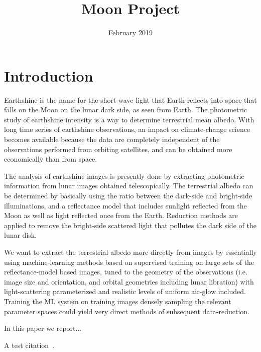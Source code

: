\documentclass[12pt,a4paper]{article}
\title{Moon Project}
\author{}
\date{February 2019}
\begin{document}
\maketitle

\section{Introduction}

Earthshine is the name for the short-wave light that Earth reflects into space that falls on the Moon on the lunar dark side, as seen from Earth. The photometric study of earthshine intensity is a way to determine terrestrial mean albedo. With long time series of earthshine observations, an impact on climate-change science becomes available because the data are completely independent of the observations performed from orbiting satellites,  and can be obtained more economically than from space.

The analysis of earthshine images is presently done by extracting photometric information from lunar images obtained telescopically. The terrestrial albedo can be determined by basically using the ratio between the dark-side and bright-side illuminations, and a reflectance model that includes sunlight reflected from the Moon as well as light reflected once from the Earth. Reduction methods are applied to remove the bright-side scattered light that pollutes the dark side of the lunar disk. 

We want to extract the terrestrial albedo more directly from images by essentially using machine-learning methods based on supervised training on large sets of the reflectance-model based images, tuned to the geometry of the observations (i.e. image size and orientation, and orbital geometries including lunar libration) with light-scattering parameterized and realistic levels of uniform air-glow included. Training the ML system on training images densely sampling the relevant parameter spaces could yield very direct methods of subsequent data-reduction.

In this paper we report...  




A test citation~\citep{2004sci...304.1299p}.






\end{document}
